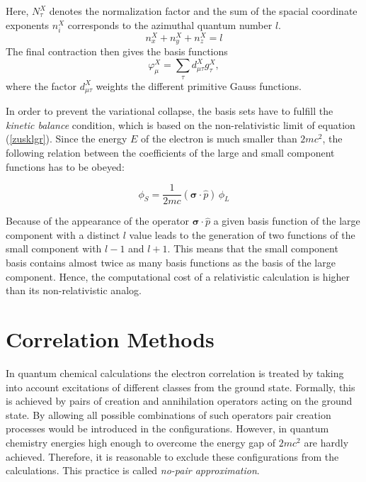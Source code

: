 Here, $N_\tau^X$ denotes the normalization factor and the sum of the spacial
coordinate exponents $n_i^X$ corresponds to the azimuthal quantum number $l$.
\begin{equation}
n_x^X+n_y^X+n_z^X=l
\end{equation}
The final contraction then gives the basis functions
\begin{equation}
\varphi^X_\mu = \sum\limits_\tau d_{\mu\tau}^Xg_\tau^X,
\end{equation}
where the factor $d_{\mu\tau}^X$ weights the different primitive Gauss functions.

In order to prevent the variational collapse, the basis sets have to fulfill
the \emph{kinetic balance} condition, which is based on the non-relativistic limit of
equation (\ref{zusklgr}). Since the energy $E$ of the electron is much smaller than
$2mc^2$, the following relation between the coefficients
of the large and small component functions has to be obeyed:

\begin{equation}\label{kinbal}
\phi_S = \frac1{2mc}(\boldsymbol{\sigma}\cdot\hat{p})\,\phi_L
\end{equation}


Because of the appearance of the operator $\boldsymbol{\sigma}\cdot\hat{p}$
a given basis function of the large component with a distinct $l$ value
leads to the generation of two functions of the small component
with $l-1$ and $l+1$.
This means that the small component basis
contains almost twice as many basis functions as the basis of the large component.
Hence, the computational cost of a relativistic calculation is higher than its
non-relativistic analog.


\section{Correlation Methods}
In quantum chemical calculations the electron correlation is treated by taking into
account excitations of different classes from the ground state. Formally, this is
achieved by pairs of creation and annihilation operators acting on the ground
state. By allowing all possible combinations of such operators pair creation
processes would be introduced in the configurations. However, in quantum chemistry
energies high enough to overcome the energy gap of $2mc^2$ are hardly achieved.
Therefore, it is reasonable to exclude these configurations from the calculations.
This practice is called \emph{no-pair approximation}.





